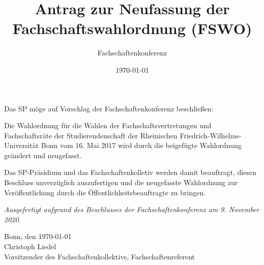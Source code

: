 \documentclass[DIV=12, parskip=half, fontsize=12pt, a4paper]{scrartcl}
\title{Antrag zur Neufassung der Fachschaftswahlordnung (FSWO)}
\author{Fachschaftenkonferenz}
\date{\today}
\begin{document}
  \maketitle
  Das SP möge auf Vorschlag der Fachschaftenkonferenz beschließen:

  \begin{linenumbers}
    Die Wahlordnung für die Wahlen der Fachschaftsvertretungen und Fachschaftsräte der Studierendenschaft der Rheinischen Friedrich-Wilhelms-Universität Bonn vom 16. Mai 2017 wird durch die beigefügte Wahlordnung geändert und neugefasst.

    Das  SP-Präsidium und das Fachschaftenkolletiv  werden  damit  beauftragt,  diesen Beschluss unverzüglich auszufertigen und die neugefasste Wahlordnung zur Veröffentlichung durch die Öffentlichkeitsbeauftragte zu bringen.
  \end{linenumbers}

  \vspace{1em}
  \textit{Ausgefertigt aufgrund des Beschlusses der Fachschaftenkonferenz am 9. November 2020.}

  Bonn, den \today \\
  Christoph Liedel \\
  {\scriptsize Vorsitzender des Fachschaftenkollektivs, Fachschaftenreferent}

  \clearpage
  
\end{document}

